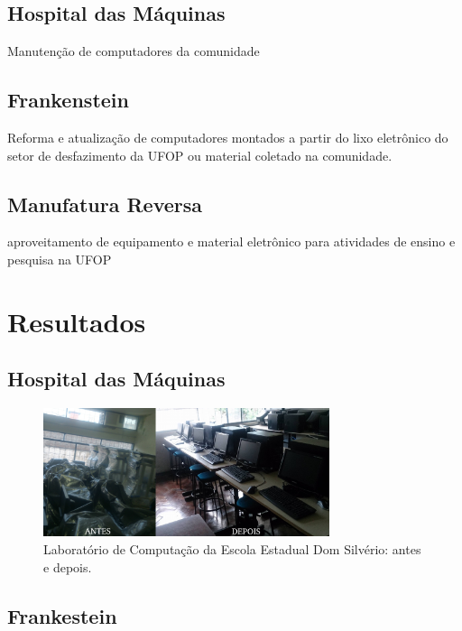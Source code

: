 \documentclass[a4paper]{ifacconf}
\begin{document}
\subsection{Hospital das Máquinas}

Manutenção de computadores da comunidade

\subsection{Frankenstein}

Reforma e atualização de computadores montados a partir do lixo eletrônico do setor de desfazimento da UFOP ou material coletado na comunidade.

\subsection{Manufatura Reversa}

aproveitamento de equipamento e material eletrônico para atividades de ensino e pesquisa na UFOP

\section{Resultados}

\subsection{Hospital das Máquinas}

\begin{figure}
\begin{center}
\includegraphics[width=8.4cm]{Figuras/2016-ee-dom-silverio-antes-depois.jpg}    
\caption{Laboratório de Computação da Escola Estadual Dom Silvério: antes e depois.} 
\label{fig:bifurcation}
\end{center}
\end{figure}

\subsection{Frankestein}
\end{document}
